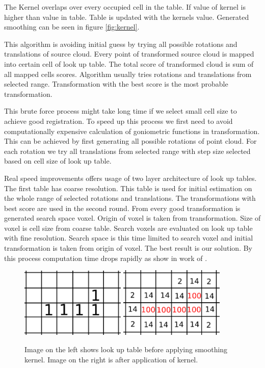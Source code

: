  The Kernel overlaps over every occupied cell in the table. If value of kernel is higher than value in table. Table is updated with the kernels value. Generated smoothing can be seen in figure \ref{fig:kernel}. 
 
 This algorithm is avoiding initial guess by trying all possible rotations and translations of source cloud. Every point of transformed source cloud is mapped into certain cell of look up table. The total score of transformed cloud is sum of all mapped cells scores. Algorithm usually tries rotations and translations from selected range. Transformation with the best score is the most probable transformation.
 
 This brute force process might take long time if we select small cell size to achieve good registration. To speed up this process we first need to avoid computationally expensive calculation of goniometric functions in transformation. This can be achieved by first generating all possible rotations of point cloud. For each rotation we try all translations from selected range with step size selected based on cell size of look up table.
 
 Real speed improvements offers usage of two layer architecture of look up tables. The first table has coarse resolution. This table is used for initial estimation on the whole range of selected rotations and translations. The transformations with best score are used in the second round. From every good transformation is generated search space voxel. Origin of voxel is taken from transformation. Size of voxel is cell size from coarse table. Search voxels are evaluated on look up table with fine resolution. Search space is this time limited to search voxel and initial transformation is taken from origin of voxel. The best result is our solution. By this process computation time drops rapidly as show in work of \cite{olson2009real}.     
   \begin{figure}
   \label{fig:kernel}
   	\centering
   	\includegraphics[width=50mm]{../img/kernel_a.png}
   	\includegraphics[width=50mm]{../img/kernel_b.png}
   	
   	\caption{Image on the left shows look up table before applying smoothing kernel. Image on the right is after application of kernel.}
   	\label{fig:raytrace}
   \end{figure} 
\newpage
     

